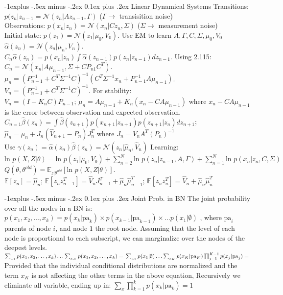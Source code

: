 \documentclass[9pt,landscape]{article}
\makeatletter
\renewcommand{\subsection}{\@startsection{subsection}{2}{0mm}%
                                {-1explus -.5ex minus -.2ex}%
                                {0.1ex plus .2ex}%
                                {\normalfont\scriptsize\bfseries}}
\makeatother
\begin{document}
\begin{multicols}{3}
\subsection{Linear Dynamical Systems}
Transitions: $p(z_n|z_{n-1} = \mathcal{N}(z_n|Az_{n-1}, \Gamma)$ ($\Gamma \rightarrow$ transisition noise)\\
Observations: $p(x_n|z_n) = \mathcal{N}(x_n|Cz_n, \Sigma)$ ($\Sigma \rightarrow$ measurement noise)\\
Initial state: $p(z_1) = \mathcal{N}(z_1|\mu_0, V_0)$. Use EM to learn $A, \Gamma, C, \Sigma, \mu_0, V_0$ \\
$\hat\alpha(z_n) = \mathcal{N}(z_n|\mu_n, V_n)$. \\
$C_n\hat\alpha(z_n) = p(x_n|z_n)\int\hat\alpha(z_{n-1})p(z_n|z_{n-1})dz_{n-1}$. Using 2.115: $C_n = \mathcal{N}(x_n|A\mu_{n-1},\Sigma+CP_{n1}C^T)$. $\mu_n = (P_{n-1}^{-1} + C^T\Sigma^{-1}C)^{-1} (C^T\Sigma^{-1}x_n + P_{n-1}^{-1}A\mu_{n-1})$. $V_n = (P_{n-1}^{-1} + C^T\Sigma^{-1}C)^{-1}$. For stability:\\
$V_n = (I-K_nC)P_{n-1}$; $\mu_n = A\mu_{n-1} + K_n(x_n - CA\mu_{n-1})$ where $x_n-CA\mu_{n-1}$ is the error between observation and expected observation.\\
$C_{n=1}\hat\beta(z_n) = \int \hat\beta(z_{n+1})p(x_{n+1}|z_{n+1}) p(z_{n+1}|z_n) dz_{n+1}$; $\hat\mu_n = \mu_n + J_n(\hat V_{n+1} - P_n)J_n^T$ where $J_n = V_nA^T(P_n)^{-1}$\\
Use $\gamma(z_n) = \hat\alpha(z_n)\hat\beta(z_n) = \mathcal{N}(z_n|\hat\mu_n, \hat V_n)$
Learning: $\text{ln } p(X,Z|\theta) = \text{ln } p(z_1|\mu_0, V_0) + \sum^N_{n=2} \text{ln } p(z_n|z_{n-1}, A, \Gamma) + \sum^N_{n=1} \text{ln } p(x_n|z_n, C, \Sigma)$ \\
$Q(\theta, \theta^{old}) = \mathbb{E}_{z|\theta^{old}}[\text{ln } p(X,Z|\theta)]$.\\
$\mathbb{E}[z_n] = \hat\mu_n$; $\mathbb{E}[z_nz_{n-1}^T] = \hat V_nJ_{n-1}^T+\hat\mu_n\hat\mu_{n-1}^T$; $\mathbb{E}[z_nz_n^T]= \hat V_n + \hat\mu_n\hat\mu_n^T$

\subsection{Joint Prob. in BN}
The joint probability over all the nodes in a BN is:
$
p(x_1,x_2,\ldots,x_k) = p(x_k|\mathrm{pa}_k) \times p(x_{k-1}|\mathrm{pa}_{k-1})\times \ldots p(x_1|\emptyset)
$
, where $\mathrm{pa}_i$ parents of node $i$, and node $1$ the root node. Assuming that the level of each node is proportional to each subscript, we can marginalize over the nodes of the deepest levels.
$
\sum_{x_1}p(x_1,x_2,\ldots,x_k) \ldots \sum_{x_K}p(x_1,x_2,\ldots,x_k) =\\
\sum_{x_1}p(x_1| \emptyset ) \ldots \sum_{x_K}p(x_K|\mathrm{pa}_K) \prod_{j=1}^{K-1}p(x_j|\mathrm{pa}_j) =\\
$
Provided that the individual conditional distributions are normalized and the term $x_K$ is not affecting the other terms in the above equation, Recursively we eliminate all variable, ending up in: $\sum_x\prod_{k=1}^kp(x_k|\mathrm{pa}_k) =1$
\vspace{.5em}

\end{multicols}
\end{document}
